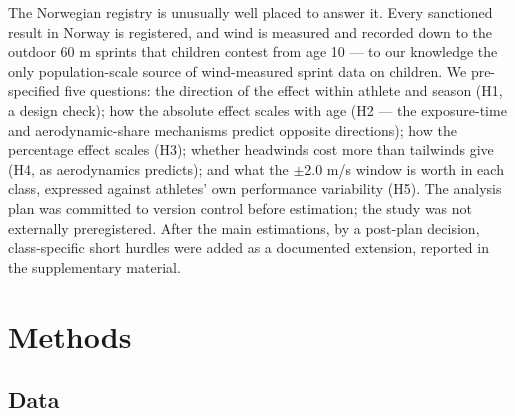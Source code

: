 \documentclass[12pt,a4paper]{article}
\begin{document}
The Norwegian registry is unusually well placed to answer it. Every sanctioned result in Norway is registered, and wind is measured and recorded down to the outdoor 60 m sprints that children contest from age 10 --- to our knowledge the only population-scale source of wind-measured sprint data on children. We pre-specified five questions: the direction of the effect within athlete and season (H1, a design check); how the absolute effect scales with age (H2 --- the exposure-time and aerodynamic-share mechanisms predict opposite directions); how the percentage effect scales (H3); whether headwinds cost more than tailwinds give (H4, as aerodynamics predicts); and what the $\pm$2.0 m/s window is worth in each class, expressed against athletes' own performance variability (H5). The analysis plan was committed to version control before estimation; the study was not externally preregistered. After the main estimations, by a post-plan decision, class-specific short hurdles were added as a documented extension, reported in the supplementary material.

\section{Methods}

\subsection{Data}
\end{document}
